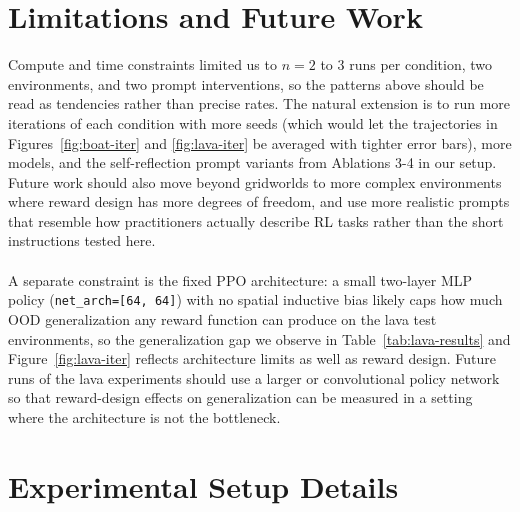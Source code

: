 \documentclass[11pt]{article}
\begin{document}
\section{Limitations and Future Work}

Compute and time constraints limited us to $n=2$ to $3$ runs per condition, two environments, and two prompt interventions, so the patterns above should be read as tendencies rather than precise rates. The natural extension is to run more iterations of each condition with more seeds (which would let the trajectories in Figures~\ref{fig:boat-iter} and \ref{fig:lava-iter} be averaged with tighter error bars), more models, and the self-reflection prompt variants from Ablations 3-4 in our setup. Future work should also move beyond gridworlds to more complex environments where reward design has more degrees of freedom, and use more realistic prompts that resemble how practitioners actually describe RL tasks rather than the short instructions tested here.
\\\\
A separate constraint is the fixed PPO architecture: a small two-layer MLP policy (\texttt{net\_arch=[64, 64]}) with no spatial inductive bias likely caps how much OOD generalization any reward function can produce on the lava test environments, so the generalization gap we observe in Table~\ref{tab:lava-results} and Figure~\ref{fig:lava-iter} reflects architecture limits as well as reward design. Future runs of the lava experiments should use a larger or convolutional policy network so that reward-design effects on generalization can be measured in a setting where the architecture is not the bottleneck.

\newpage



\newpage
\appendix

\section{Experimental Setup Details}
\end{document}
